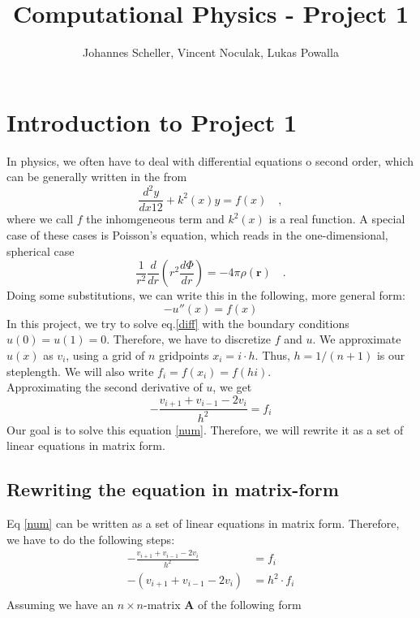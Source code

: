 \documentclass[10pt,a4paper]{article}
\author{Johannes Scheller, Vincent Noculak, Lukas Powalla}
\title{Computational Physics - Project 1}
\begin{document}
\maketitle
\newpage
\tableofcontents
\newpage
\section{Introduction to Project 1}
In physics, we often have to deal with differential equations o second order, which can be generally written in the from
\begin{equation}
	\frac{d^{2}y}{dx1{2}}+k^2(x)y=f(x)\quad,
\end{equation}
where we call $f$ the inhomgeneous term and $k^2(x)$ is a real function. A special case of these cases is Poisson's equation, which reads in the one-dimensional, spherical case
\begin{equation}
	\frac{1}{r^2}\frac{d}{dr}\left(r^2\frac{d\Phi}{dr}\right)=-4\pi\rho\left(\mathbf{r}\right)\quad.
\end{equation}
Doing some substitutions, we can write this in the following, more general form:
\begin{equation}
	\label{diff}
	-u''(x)=f(x)
\end{equation}
In this project, we try to solve eq.\eqref{diff} with the boundary conditions $u(0)=u(1)=0$. Therefore, we have to discretize $f$ and $u$. We approximate $u(x)$ as $v_i$, using a grid of $n$ gridpoints $x_i=i\cdot h$. Thus, $h=1/(n+1)$ is our steplength. We will also write $f_i=f(x_i)=f(hi)$.\\Approximating the second derivative of $u$, we get
\begin{equation}
	\label{num}
	-\frac{v_{i+1}+v_{i-1}-2v_i}{h^2}=f_i
\end{equation}
Our goal is to solve this equation \eqref{num}. Therefore, we will rewrite it as a set of linear equations in matrix form.

\subsection{Rewriting the equation in matrix-form}
Eq \eqref{num} can be written as a set of linear equations in matrix form. Therefore, we have to do the following steps:
\begin{align}
	-\frac{v_{i+1}+v_{i-1}-2v_i}{h^2}&=f_i\nonumber\\
	\label{vorform}-\left(v_{i+1}+v_{i-1}-2v_i\right)&=h^2\cdot f_i\\
\end{align}
Assuming we have an $n\times n$-matrix $\mathbf A$ of the following form
\end{document}
